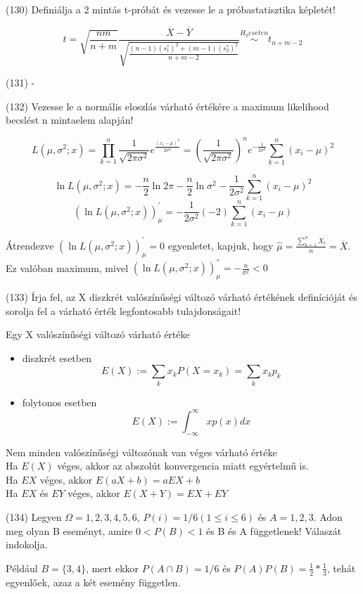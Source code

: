 \documentclass[12p]{article}
\begin{document}
(130) Definiálja a 2 mintás t-próbát és vezesse le a próbastatisztika képletét!

$$t = \sqrt{\frac{nm}{n+m}}\frac{\overline{X} - \overline{Y}}{\sqrt{\frac{(n-1)(s^*_1)^2 + (m-1)(s^*_2)^2}{n+m-2}}} \stackrel{H_0 eseten}{\sim}
t_{n+m-2}$$

(131) -

(132) Vezesse le a normális eloszlás várható értékére a maximum likelihood becslést n mintaelem alapján!

$$L(\mu, \sigma^2;x) 
= \prod^n_{k=1} \frac{1}{\sqrt{2\pi \sigma^2}} 
e^{\frac{(x_i-\mu)^2}{2\sigma^2}}
=\left(\frac{1}{\sqrt{2\pi \sigma^2}}\right)^n 
e^{-\frac{1}{2 \sigma^2}} \sum^n_{k=1} (x_i - \mu )^2$$

$$\ln L(\mu, \sigma^2;x) = - \frac{n}{2} \ln 2\pi - \frac{n}{2} \ln \sigma^2 - \frac{1}{2\sigma^2} \sum^n_{k=1} (x_i - \mu)^2$$
$$(\ln L(\mu,\sigma^2;x))^{'}_{\mu} = - \frac{1}{2\sigma^2}(-2)\sum^n_{k=1}(x_i - \mu)$$

Átrendezve $(\ln L(\mu,\sigma^2;x))^{'}_{\mu} = 0$ egyenletet, kapjuk, hogy $\displaystyle{\hat{\mu} = \frac{\sum^n_{k=1} X_i}{n} = \overline{X}}$. Ez valóban maximum, mivel $(\ln L(\mu,\sigma^2;x))^{''}_{\mu} = -\frac{n}{\sigma^2} < 0$

(133) Írja fel, az X diszkrét valószínűségi változó várható értékének definícióját és sorolja fel
a várható érték legfontosabb tulajdonságait!

Egy X valószínűségi változó várható értéke

\begin{itemize}
	\item diszkrét esetben
		$$E(X) := \sum_k x_k P(X = x_k) = \sum_k x_k p_k$$
		
	\item folytonos esetben
		$$E(X) := \int_{-\infty}^\infty xp(x)dx$$
\end{itemize}

Nem minden valószínűségi változónak van véges várható értéke\\
Ha $E(X)$ véges, akkor az abszolút konvergencia miatt egyértelmű is.\\
Ha $EX$ véges, akkor $E(aX+b)=aEX+b$\\
Ha $EX$ és $EY$ véges, akkor $E(X+Y)=EX+EY$

(134) Legyen $\Omega = {1, 2, 3, 4, 5, 6}$, $P(i) = 1/6 (1 \leq i \leq 6)$ és $A = {1, 2, 3}$. Adon meg olyan B
eseményt, amire $0 < P(B) < 1$ és B és A függetlenek! Válaszát indokolja.

 Például $B = \{3, 4\}$, mert ekkor $P(A \cap B) = 1/6$ és $P(A)P(B) = \frac{1}{2} * \frac{1}{3}$, tehát egyenlőek, azaz a két esemény független.
\end{document}
